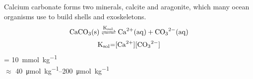 Calcium carbonate forms two minerals, calcite and aragonite, which many ocean organisms use to build shells and exoskeletons.
\[\ce{CaCO3(s) <=>[K_{sol}] Ca^2+(aq) + CO3^2-(aq)}\]
\[\ce{K_{sol}=[Ca^2+][CO3^2-]}\]
\ce{[Ca^2+]} = \qty{10}{\mmol\per\kg}
\\\ce{[CO3^2-]} $\approx$ \qtyrange[range-units = single]{40}{200}{\umol\per\kg}